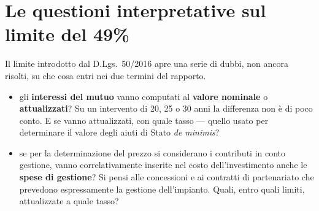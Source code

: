 
\section{Le questioni interpretative sul limite del 49\%}

Il limite introdotto dal D.Lgs.\ 50/2016 apre una serie di dubbi, non ancora risolti, su che cosa
entri nei due termini del rapporto.


\begin{itemize}
  \item gli \textbf{interessi del mutuo} vanno computati al \textbf{valore nominale} o
    \textbf{attualizzati}? Su un intervento di 20, 25 o 30 anni la differenza non è di poco conto.
    E se vanno attualizzati, con quale tasso --- quello usato per determinare il valore degli aiuti
    di Stato \textit{de minimis}?
  \item se per la determinazione del prezzo si considerano i contributi in conto gestione, vanno
    correlativamente inserite nel costo dell'investimento anche le \textbf{spese di gestione}? Si
    pensi alle concessioni e ai contratti di partenariato che prevedono espressamente la gestione
    dell'impianto. Quali, entro quali limiti, attualizzate a quale tasso?
\end{itemize}


